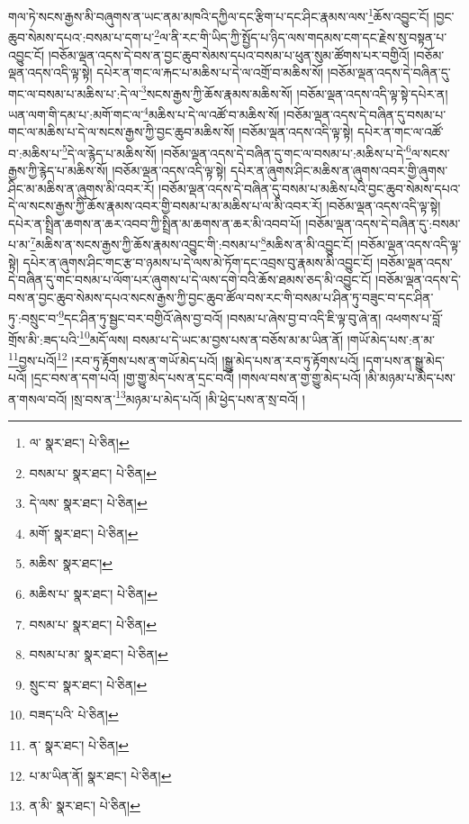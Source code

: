 གལ་ཏེ་སངས་རྒྱས་མི་བཞུགས་ན་ཡང་ནམ་མཁའི་དཀྱིལ་དང་རྩིག་པ་དང་ཤིང་རྣམས་ལས་\footnote{ལ་  སྣར་ཐང་།  པེ་ཅིན། }ཆོས་འབྱུང་ངོ། །བྱང་ཆུབ་སེམས་དཔའ་:བསམ་པ་དག་པ་\footnote{བསམ་པ་  སྣར་ཐང་།  པེ་ཅིན། }ལ་ནི་རང་གི་ཡིད་ཀྱི་སྤྱོད་པ་ཉིད་ལས་གདམས་ངག་དང་རྗེས་སུ་བསྟན་པ་འབྱུང་ངོ། །བཅོམ་ལྡན་འདས་དེ་བས་ན་བྱང་ཆུབ་སེམས་དཔའ་བསམ་པ་ཕུན་སུམ་ཚོགས་པར་བགྱིའོ། །བཅོམ་ལྡན་འདས་འདི་ལྟ་སྟེ། དཔེར་ན་གང་ལ་རྐང་པ་མཆིས་པ་དེ་ལ་འགྲོ་བ་མཆིས་སོ། །བཅོམ་ལྡན་འདས་དེ་བཞིན་དུ་གང་ལ་བསམ་པ་མཆིས་པ་:དེ་ལ་\footnote{དེ་ལས་  སྣར་ཐང་།  པེ་ཅིན། }སངས་རྒྱས་ཀྱི་ཆོས་རྣམས་མཆིས་སོ། །བཅོམ་ལྡན་འདས་འདི་ལྟ་སྟེ་དཔེར་ན། ཡན་ལག་གི་དམ་པ་:མགོ་གང་ལ་\footnote{མགོ་  སྣར་ཐང་།  པེ་ཅིན། }མཆིས་པ་དེ་ལ་འཚོ་བ་མཆིས་སོ། །བཅོམ་ལྡན་འདས་དེ་བཞིན་དུ་བསམ་པ་གང་ལ་མཆིས་པ་དེ་ལ་སངས་རྒྱས་ཀྱི་བྱང་ཆུབ་མཆིས་སོ། །བཅོམ་ལྡན་འདས་འདི་ལྟ་སྟེ། དཔེར་ན་གང་ལ་འཚོ་བ་:མཆིས་པ་\footnote{མཆིས་  སྣར་ཐང་། }དེ་ལ་རྙེད་པ་མཆིས་སོ། །བཅོམ་ལྡན་འདས་དེ་བཞིན་དུ་གང་ལ་བསམ་པ་:མཆིས་པ་དེ་\footnote{མཆིས་པ་  སྣར་ཐང་།  པེ་ཅིན། }ལ་སངས་རྒྱས་ཀྱི་རྙེད་པ་མཆིས་སོ། །བཅོམ་ལྡན་འདས་འདི་ལྟ་སྟེ། དཔེར་ན་ཞུགས་ཤིང་མཆིས་ན་ཞུགས་འབར་གྱི་ཞུགས་ཤིང་མ་མཆིས་ན་ཞུགས་མི་འབར་རོ། །བཅོམ་ལྡན་འདས་དེ་བཞིན་དུ་བསམ་པ་མཆིས་པའི་བྱང་ཆུབ་སེམས་དཔའ་དེ་ལ་སངས་རྒྱས་ཀྱི་ཆོས་རྣམས་འབར་གྱི་བསམ་པ་མ་མཆིས་པ་ལ་མི་འབར་རོ། །བཅོམ་ལྡན་འདས་འདི་ལྟ་སྟེ། དཔེར་ན་སྤྲིན་ཆགས་ན་ཆར་འབབ་ཀྱི་སྤྲིན་མ་ཆགས་ན་ཆར་མི་འབབ་པོ། །བཅོམ་ལྡན་འདས་དེ་བཞིན་དུ་:བསམ་པ་མ་\footnote{བསམ་པ་  སྣར་ཐང་།  པེ་ཅིན། }མཆིས་ན་སངས་རྒྱས་ཀྱི་ཆོས་རྣམས་འབྱུང་གི་:བསམ་པ་\footnote{བསམ་པ་མ་  སྣར་ཐང་།  པེ་ཅིན། }མཆིས་ན་མི་འབྱུང་ངོ། །བཅོམ་ལྡན་འདས་འདི་ལྟ་སྟེ། དཔེར་ན་ཞུགས་ཤིང་གང་རྩ་བ་ཉམས་པ་དེ་ལས་མེ་ཏོག་དང་འབྲས་བུ་རྣམས་མི་འབྱུང་ངོ། །བཅོམ་ལྡན་འདས་དེ་བཞིན་དུ་གང་བསམ་པ་ལོག་པར་ཞུགས་པ་དེ་ལས་དགེ་བའི་ཆོས་ཐམས་ཅད་མི་འབྱུང་ངོ། །བཅོམ་ལྡན་འདས་དེ་བས་ན་བྱང་ཆུབ་སེམས་དཔའ་སངས་རྒྱས་ཀྱི་བྱང་ཆུབ་ཚོལ་བས་རང་གི་བསམ་པ་ཤིན་ཏུ་བཟུང་བ་དང་ཤིན་ཏུ་:བསྲུང་བ་\footnote{སྲུང་བ་  སྣར་ཐང་།  པེ་ཅིན། }དང་ཤིན་ཏུ་སྦྱང་བར་བགྱིའོ་ཞེས་བྱ་བའོ། །བསམ་པ་ཞེས་བྱ་བ་འདི་ཇི་ལྟ་བུ་ཞེ་ན། འཕགས་པ་བློ་གྲོས་མི་:ཟད་པའི་\footnote{བཟད་པའི་  པེ་ཅིན། }མདོ་ལས། བསམ་པ་དེ་ཡང་མ་བྱས་པས་ན་བཅོས་མ་མ་ཡིན་ནོ། །གཡོ་མེད་པས་:ན་མ་\footnote{ན་  སྣར་ཐང་།  པེ་ཅིན། }བྱས་པའོ།\footnote{པ་མ་ཡིན་ནོ།  སྣར་ཐང་།  པེ་ཅིན། } །རབ་ཏུ་རྟོགས་པས་ན་གཡོ་མེད་པའོ། །སྒྱུ་མེད་པས་ན་རབ་ཏུ་རྟོགས་པའོ། །དག་པས་ན་སྒྱུ་མེད་པའོ། །དྲང་བས་ན་དག་པའོ། །གྱ་གྱུ་མེད་པས་ན་དྲང་བའོ། །གསལ་བས་ན་གྱ་གྱུ་མེད་པའོ། །མི་མཉམ་པ་མེད་པས་ན་གསལ་བའོ། །སྲ་བས་ན་\footnote{ན་མི་  སྣར་ཐང་།  པེ་ཅིན། }མཉམ་པ་མེད་པའོ། །མི་ཕྱེད་པས་ན་སྲ་བའོ། །
